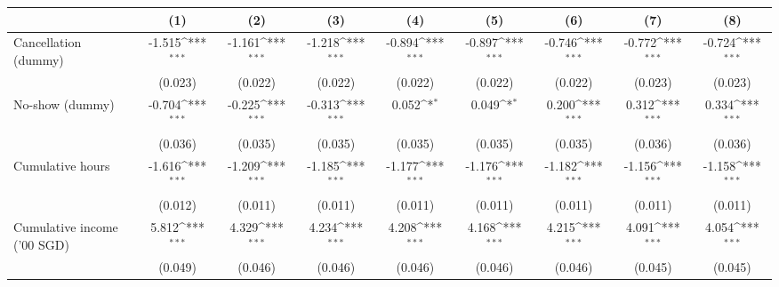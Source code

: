 \documentclass[reviewmode]{restat}
\begin{document}
\begin{appendices}
\begin{table}[h]
{\begin{minipage}{18cm}
 			\footnotesize
 			\setlength{\tabcolsep}{2pt}
				{
				\def\sym#1{\ifmmode^{#1}\else\(^{#1}\)\fi}
				\begin{tabular}{l*{8}{c}}
				\toprule
				\toprule
				                    &\multicolumn{1}{c}{(1)}         &\multicolumn{1}{c}{(2)}         &\multicolumn{1}{c}{(3)}         &\multicolumn{1}{c}{(4)}         &\multicolumn{1}{c}{(5)}         &\multicolumn{1}{c}{(6)}         &\multicolumn{1}{c}{(7)}         &\multicolumn{1}{c}{(8)}         \\
				\midrule
				Cancellation (dummy)&      -1.515\sym{***}&      -1.161\sym{***}&      -1.218\sym{***}&      -0.894\sym{***}&      -0.897\sym{***}&      -0.746\sym{***}&      -0.772\sym{***}&      -0.724\sym{***}\\
				                    &     (0.023)         &     (0.022)         &     (0.022)         &     (0.022)         &     (0.022)         &     (0.022)         &     (0.023)         &     (0.023)         \\
				\addlinespace
				No-show (dummy)     &      -0.704\sym{***}&      -0.225\sym{***}&      -0.313\sym{***}&       0.052\sym{*}         &       0.049\sym{*}         &       0.200\sym{***}&       0.312\sym{***}&       0.334\sym{***}\\
				                    &     (0.036)         &     (0.035)         &     (0.035)         &     (0.035)         &     (0.035)         &     (0.035)         &     (0.036)         &     (0.036)         \\
				\addlinespace
				Cumulative hours    &      -1.616\sym{***}&      -1.209\sym{***}&      -1.185\sym{***}&      -1.177\sym{***}&      -1.176\sym{***}&      -1.182\sym{***}&      -1.156\sym{***}&      -1.158\sym{***}\\
				                    &     (0.012)         &     (0.011)         &     (0.011)         &     (0.011)         &     (0.011)         &     (0.011)         &     (0.011)         &     (0.011)         \\
				\addlinespace
				Cumulative income ('00 SGD)&       5.812\sym{***}&       4.329\sym{***}&       4.234\sym{***}&       4.208\sym{***}&       4.168\sym{***}&       4.215\sym{***}&       4.091\sym{***}&       4.054\sym{***}\\
				                    &     (0.049)         &     (0.046)         &     (0.046)         &     (0.046)         &     (0.046)         &     (0.046)         &     (0.045)         &     (0.045)         \\

\end{tabular}}
\end{minipage}}
\end{table}
\end{appendices}
\end{document}
